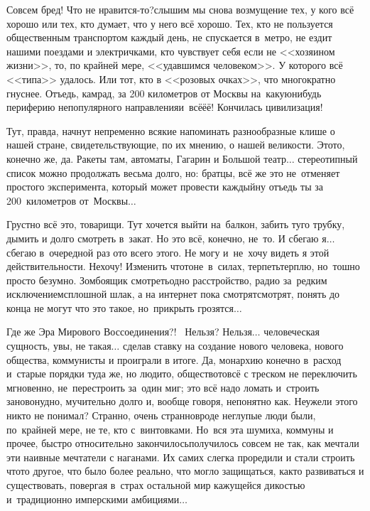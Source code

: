 \diagdash Совсем бред! Что не нравится-то?\mdash слышим мы снова возмущение тех, у кого всё хорошо или тех, кто думает, что у него всё хорошо. Тех, кто не пользуется общественным транспортом каждый день, не спускается в~метро, не ездит нашими поездами и электричками, кто чувствует себя если не <<хозяином жизни>>, то, по крайней мере, <<удавшимся человеком>>. У которого всё <<типа>> удалось. Или тот, кто в <<розовых очках>>, что многократно гнуснее. Отъедь, камрад, за 200 километров от Москвы на~какую\sdash нибудь периферию непопулярного направления\mdash и~всё\sdash ё\sdash ё! Кончилась цивилизация! 

Тут, правда, начнут непременно всякие напоминать разнообразные клише о нашей стране, свидетельствующие, по их мнению, о нашей великости. Это\sdash то, конечно же, да. Ракеты там, автоматы, Гагарин и Большой театр$\ldots$ стереотипный список можно продолжать весьма долго, но: братцы, всё же это не~отменяет простого эксперимента, который может провести каждый\mdash ну отъедь ты за 200~километров от~Москвы$\ldots$

Грустно всё это, товарищи. Тут хочется выйти на~балкон, забить туго трубку, дымить и долго смотреть в~закат. Но это всё, конечно, не~то. И сбегаю я$\ldots$ сбегаю в~очередной раз ото всего этого. Не могу и~не~хочу видеть я этой действительности. Не\sdash хо\sdash чу! Изменить что\sdash то\mdash не~в~силах, терпеть\mdash терплю, но~тошно просто безумно. Зомбоящик смотреть\mdash одно расстройство, радио за~редким исключением\mdash сплошной шлак, а на интернет пока смотрят\sdash смотрят, понять до конца не могут что это такое, но~прикрыть грозятся$\ldots$

Где же Эра Мирового Воссоединения?!~\cite{ТуманностьАндромеды} Нельзя? Нельзя$\ldots$ человеческая сущность, увы, не такая$\ldots$ сделав ставку на создание нового человека, нового общества, коммунисты и проиграли в итоге. Да, монархию конечно в~расход и~старые порядки туда же, но люди\sdash то, общество\sdash то\mdash всё с треском не переключить мгновенно, не~перестроить за~один миг; это всё надо ломать и~строить заново\mdash нудно, мучительно долго и, вообще говоря, непонятно как. Неужели этого никто не понимал? Странно, очень странно\mdash вроде неглупые люди были, по~крайней мере, не те, кто с~винтовками. Но~вся эта шумиха, коммуны и прочее, быстро относительно закончилось\mdash получилось совсем не так, как мечтали эти наивные мечтатели с наганами. Их самих слегка проредили и стали строить что\sdash то другое, что было более реально, что могло защищаться, как\sdash то развиваться и существовать, повергая в~страх остальной мир кажущейся дикостью и~традиционно имперскими амбициями$\ldots$

